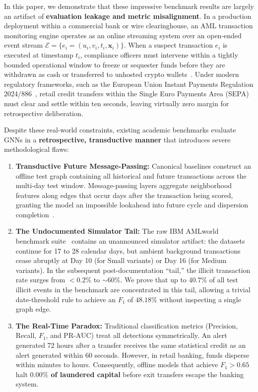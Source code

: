 \documentclass[pdflatex,sn-mathphys,Numbered]{sn-jnl}
\theoremstyle{thmstyleone}
\theoremstyle{thmstyletwo}
\theoremstyle{thmstylethree}
\begin{document}
In this paper, we demonstrate that these impressive benchmark results are largely an artifact of \textbf{evaluation leakage and metric misalignment}. In a production deployment within a commercial bank or wire clearinghouse, an AML transaction monitoring engine operates as an online streaming system over an open-ended event stream $\mathcal{E}=\{e_i=(u_i, v_i, t_i, \mathbf{x}_i)\}$. When a suspect transaction $e_i$ is executed at timestamp $t_i$, compliance officers must intervene within a tightly bounded operational window to freeze or sequester funds before they are withdrawn as cash or transferred to unhosted crypto wallets~\cite{eu2024instant,maganti2026liability}. Under modern regulatory frameworks, such as the European Union Instant Payments Regulation 2024/886~\cite{eu2024instant}, retail credit transfers within the Single Euro Payments Area (SEPA) must clear and settle within ten seconds, leaving virtually zero margin for retrospective deliberation.

Despite these real-world constraints, existing academic benchmarks evaluate GNNs in a \textbf{retrospective, transductive manner} that introduces severe methodological flaws:
\begin{enumerate}
    \item \textbf{Transductive Future Message-Passing:} Canonical baselines construct an offline test graph containing all historical and future transactions across the multi-day test window. Message-passing layers aggregate neighborhood features along edges that occur days after the transaction being scored, granting the model an impossible lookahead into future cycle and dispersion completion~\cite{nguyen2022future}.
    \item \textbf{The Undocumented Simulator Tail:} The raw IBM AMLworld benchmark suite~\cite{altman2023ibmaml} contains an unannounced simulator artifact: the datasets continue for 17 to 28 calendar days, but ambient background transactions cease abruptly at Day 10 (for Small variants) or Day 16 (for Medium variants). In the subsequent post-documentation ``tail,'' the illicit transaction rate surges from $<0.2\%$ to $\sim60\%$. We prove that up to $40.7\%$ of all test illicit events in the benchmark are concentrated in this tail, allowing a trivial date-threshold rule to achieve an $F_1$ of $48.18\%$ without inspecting a single graph edge.
    \item \textbf{The Real-Time Paradox:} Traditional classification metrics (Precision, Recall, $F_1$, and PR-AUC) treat all detections symmetrically. An alert generated 72 hours after a transfer receives the same statistical credit as an alert generated within 60 seconds. However, in retail banking, funds disperse within minutes to hours. Consequently, offline models that achieve $F_1 > 0.65$ halt \textbf{$0.00\%$ of laundered capital} before exit transfers escape the banking system.
\end{enumerate}
\end{document}
